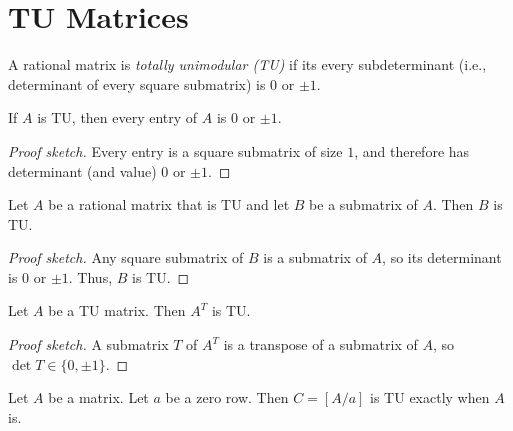 \section{TU Matrices}

\begin{definition}[TU matrix]
  \label{def:code_tu_matrix}
  \leanok
  A rational matrix is \emph{totally unimodular (TU)} if its every subdeterminant (i.e., determinant of every square submatrix) is $0$ or $\pm 1$.
\end{definition}

\begin{lemma}
  \label{lem:code_tu_entries}
  \leanok
  If $A$ is TU, then every entry of $A$ is $0$ or $\pm 1$.
\end{lemma}

\begin{proof}[Proof sketch]
  \leanok
  Every entry is a square submatrix of size $1$, and therefore has determinant (and value) $0$ or $\pm 1$.
\end{proof}

\begin{lemma}
  \label{lem:code_submatrix_of_tu}
  \leanok
  Let $A$ be a rational matrix that is TU and let $B$ be a submatrix of $A$. Then $B$ is TU.
\end{lemma}

\begin{proof}[Proof sketch]
  \leanok
  Any square submatrix of $B$ is a submatrix of $A$, so its determinant is $0$ or $\pm 1$. Thus, $B$ is TU.
\end{proof}

\begin{lemma}[transpose of TU is TU]
  \label{lem:code_tu_transpose}
  \leanok
  Let $A$ be a TU matrix. Then $A^{T}$ is TU.
\end{lemma}

\begin{proof}[Proof sketch]
  \leanok
  A submatrix $T$ of $A^{T}$ is a transpose of a submatrix of $A$, so $\det T \in \{0, \pm 1\}$.
\end{proof}

\begin{lemma}
  \label{lem:code_tu_add_zero_row}
  \leanok
  Let $A$ be a matrix. Let $a$ be a zero row. Then $C = \left[ A / a \right]$ is TU exactly when $A$ is.
\end{lemma}

